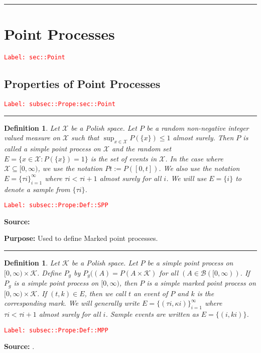 \documentclass[12pt]{article}
\newcommand{\mc}{\mathcal}
\newcommand{\ms}{\mathscr}
\newcommand{\tr}{\textcolor{red}}
\newcommand{\labe}[1]{\tr{\texttt{Label: #1}}}
\newcommand{\purpose}{\textbf{Purpose: }}
\newcommand{\lin}{\rule{\linewidth}{0.4 pt}}
\newcommand{\x}{x}								%
\renewcommand{\t}{t}							%
\newcommand{\rt}{\tau}							%
\renewcommand{\mark}{\kappa}					%
\newcommand{\rp}{P}								%
\newcommand{\typset}{A}							%
\newcommand{\spce}{\mc{X}}						%
\newcommand{\evs}{E}							%
\newcommand{\mspce}{\mc{K}}						%
\newcommand{\rpg}{\rp_g}						%
\newtheorem{defn}[thms]{Definition}
\begin{document}
\lin 

\section{Point Processes}
\label{sec::Point}\labe{sec::Point}

\subsection{Properties of Point Processes}
\label{subsec::Prope:sec::Point}\labe{subsec::Prope:sec::Point}

\lin

\begin{defn}
Let \(\spce\) be a Polish space. Let \(\rp\) be a random non-negative integer valued measure on \(\spce\) such that \(\sup_{\x \in \spce} \rp(\{\x\})\leq 1\) almost surely. Then \(\rp\) is called a simple point process on \(\spce\) and the random set \(E = \{\x \in \spce: \rp(\{\x\}) = 1\}\) is the set of events in \(\spce\). In the case where \(\spce \subseteq [0,\infty)\), we use the notation \(\rp{\t} := \rp([0,\t])\). We also use the notation \(\evs = \{\rt{i}\}_{i=1}^{\infty}\) where \(\rt{i} < \rt{i+1}\) almost surely for all \(i\). We will use \(\evs = \{	{i}\}\) to denote a sample from \(\{\rt{i}\}\).
\label{subsec::Prope:Def::SPP}
\end{defn}
\labe{subsec::Prope:Def::SPP}

\textbf{Source: }\cite[Definition 9.1.II]{DalVer08}

\purpose Used to define Marked point processes.

\lin

\begin{defn}
Let \(\mspce\) be a Polish space. Let \(\rp\) be a simple point process on \([0,\infty)\times \mspce\). Define \(\rpg\) by \(\rpg((\typset) = \rp(\typset\times \mspce)\) for all \((\typset \in \ms{B}([0,\infty))\). If \(\rpg\) is a simple point process on \([0,\infty)\), then \(\rp\) is a simple marked point process on \([0,\infty)\times \mspce\). If \((\t,k) \in \evs\), then we call \(\t\) an event of \(\rp\) and \(k\) is the corresponding mark. We will generally write \(\evs = \{(\rt{i},\mark{i})\}_{i=1}^{\infty}\) where \(\rt{i} < \rt{i+1}\) almost surely for all \(i\). Sample events are written as \(\evs = \{(	{i},k{i})\}\). 
\label{subsec::Prope:Def::MPP}
\end{defn}
\labe{subsec::Prope:Def::MPP}

\textbf{Source: }\cite[Definition 6.4.I]{DalVer03}.
\end{document}
